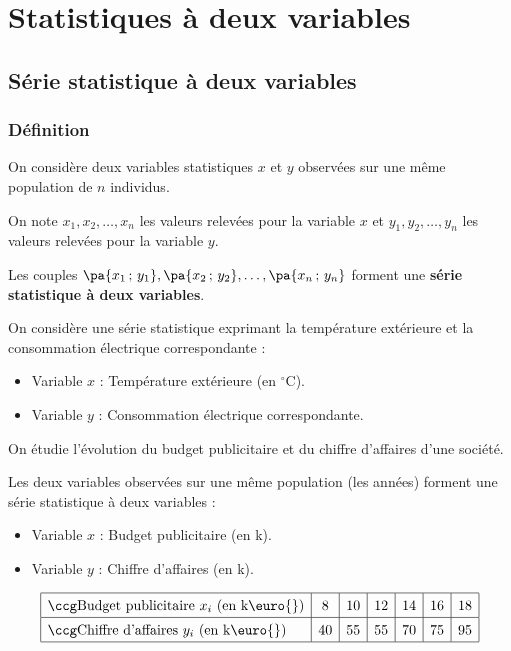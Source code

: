 \chapter{Statistiques à deux variables}

\section{Série statistique à deux variables}

\subsection{Définition}

\begin{defin}
	On considère deux variables statistiques $x$ et $y$ observées sur une même population de $n$ individus.

	On note $x_{1},x_{2},\dots,x_{n}$ les valeurs relevées pour la variable $x$ et $y_{1},y_{2},\dots,y_{n}$ les valeurs relevées pour la variable $y$.

	Les couples $\pa{x_{1}\,;\,y_{1}}, \pa{x_{2}\,;\,y_{2}}, \dots, \pa{x_{n}\,;\,y_{n}}$ forment une \textbf{série statistique à deux variables}.
\end{defin}

\begin{ex}
	On considère une série statistique exprimant la température extérieure et la consommation électrique correspondante :
	\begin{itemize}
		\item Variable $x$ : Température extérieure (en $^{\circ}\text{C}$).
		\item Variable $y$ : Consommation électrique correspondante.
	\end{itemize}
\end{ex}

\begin{ex}
	On étudie l'évolution du budget publicitaire et du chiffre d'affaires d'une société.

	Les deux variables observées sur une même population (les années) forment une série statistique à deux variables :
	\begin{itemize}
		\item Variable $x$ : Budget publicitaire (en k\eur{}).
		\item Variable $y$ : Chiffre d'affaires (en k\eur{}).
	\end{itemize}
	\[
		\def\arraystretch{1.4}
		\begin{array}{|l|c|c|c|c|c|c|}\hline
			\ccg \text{Budget publicitaire } x_i \text{ (en k\euro{})} & 8  & 10 & 12 & 14 & 16 & 18 \\ \hline
			\ccg \text{Chiffre d'affaires } y_i \text{ (en k\euro{})}  & 40 & 55 & 55 & 70 & 75 & 95 \\ \hline
		\end{array}
	\]
\end{ex}

